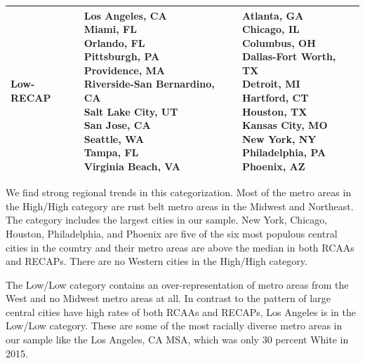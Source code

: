 \documentclass[11pt,]{article}
\begin{document}
\begin{table}[t]
\begin{tabular}{l|l|l}
Low-RECAP & \makecell[l]{Los Angeles, CA\\                 Miami, FL\\                 Orlando, FL\\                 Pittsburgh, PA\\                 Providence, MA\\                 Riverside-San Bernardino, CA\\                 Salt Lake City, UT\\                 San Jose, CA\\                 Seattle, WA\\                 Tampa, FL\\                 Virginia Beach, VA} & \makecell[l]{Atlanta, GA\\                 Chicago, IL\\                 Columbus, OH\\                 Dallas-Fort Worth, TX\\                 Detroit, MI\\                 Hartford, CT\\                 Houston, TX\\                 Kansas City, MO\\                 New York, NY\\                 Philadelphia, PA\\                 Phoenix, AZ}\\
\hline
\end{tabular}
\end{table}

We find strong regional trends in this categorization. Most of the metro
areas in the High/High category are rust belt metro areas in the Midwest
and Northeast. The category includes the largest cities in our sample.
New York, Chicago, Houston, Philadelphia, and Phoenix are five of the
six most populous central cities in the country and their metro areas
are above the median in both RCAAs and RECAPs. There are no Western
cities in the High/High category.

The Low/Low category contains an over-representation of metro areas from
the West and no Midwest metro areas at all. In contrast to the pattern
of large central cities have high rates of both RCAAs and RECAPs, Los
Angeles is in the Low/Low category. These are some of the most racially
diverse metro areas in our sample like the Los Angeles, CA MSA, which
was only 30 percent White in 2015.
\end{document}
